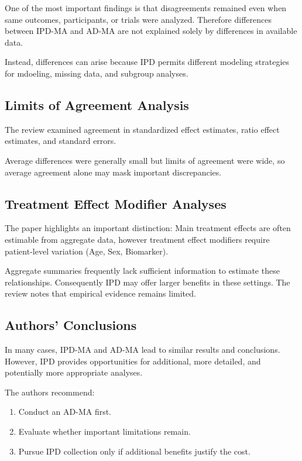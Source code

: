 \documentclass[11pt]{article}
\begin{document}
One of the most important findings is that disagreements remained even when same outcomes, participants, or trials were analyzed. Therefore differences between IPD-MA and AD-MA are not explained solely by differences in available data.

Instead, differences can arise because IPD permits different modeling strategies for mdoeling, missing data, and subgroup analyses.

\subsection*{Limits of Agreement Analysis}

The review examined agreement in standardized effect estimates, ratio effect estimates, and standard errors.

Average differences were generally small but limits of agreement were wide, so average agreement alone may mask important discrepancies.

\subsection*{Treatment Effect Modifier Analyses}

The paper highlights an important distinction: Main treatment effects are often estimable from aggregate data, however treatment effect modifiers require patient-level variation (Age, Sex, Biomarker).

Aggregate summaries frequently lack sufficient information to estimate these relationships. Consequently IPD may offer larger benefits in these settings. The review notes that empirical evidence remains limited.

\subsection*{Authors' Conclusions}

In many cases, IPD-MA and AD-MA lead to similar results and conclusions. However, IPD provides opportunities for additional, more detailed, and potentially more appropriate analyses.

The authors recommend:

\begin{enumerate}
    \item Conduct an AD-MA first.
    \item Evaluate whether important limitations remain.
    \item Pursue IPD collection only if additional benefits justify the cost.
\end{enumerate}
\end{document}
